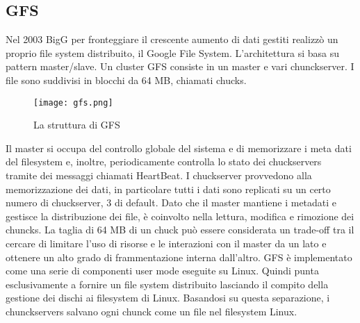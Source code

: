 \subsection{GFS}
Nel 2003 BigG per fronteggiare il crescente aumento di dati gestiti realizzò un proprio file system distribuito, il Google File System. L'architettura si basa su pattern master/slave. Un cluster GFS consiste in un master e vari chunckserver. I file sono suddivisi in blocchi da 64 MB, chiamati chucks. \\
\begin{figure}[ht]
  \begin{center}
    \texttt{[image: gfs.png]}
    \caption{La struttura di GFS}
    \label{gfs}
  \end{center}
\end{figure}
Il master si occupa del controllo globale del sistema e di memorizzare i meta dati del filesystem e, inoltre, periodicamente controlla lo stato dei chuckservers tramite dei messaggi chiamati HeartBeat. I chuckserver provvedono alla memorizzazione dei dati, in particolare tutti i dati sono replicati su un certo numero di chuckserver, 3 di default. 
Dato che il master mantiene i metadati e gestisce la distribuzione dei file, è coinvolto nella lettura, modifica e rimozione dei chuncks. La taglia di 64 MB di un chuck può essere considerata un trade-off tra il cercare di limitare l'uso di risorse e le interazioni con il master da un lato e ottenere un alto grado di frammentazione interna dall'altro. GFS è implementato come una serie di componenti user mode eseguite su Linux. Quindi punta esclusivamente a fornire un file system distribuito lasciando il compito della gestione dei dischi ai filesystem di Linux. Basandosi su questa separazione, i chunckservers salvano ogni chunck come un file nel filesystem Linux.\cite{ghemawat03}
